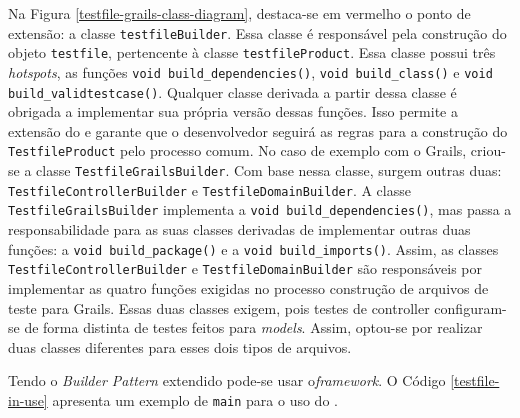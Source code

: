 Na Figura \ref{testfile-grails-class-diagram}, destaca-se em vermelho
o ponto de extensão: a classe \lstinline|testfileBuilder|. Essa classe é responsável
pela construção do objeto \lstinline|testfile|, pertencente à classe
\lstinline|testfileProduct|. Essa classe possui três \textit{hotspots}, as funções
\lstinline|void build_dependencies()|, \lstinline|void build_class()| e
\lstinline|void build_validtestcase()|. Qualquer classe derivada a partir dessa classe é
obrigada a implementar sua própria versão dessas funções. Isso permite a extensão
do \framework e garante que o desenvolvedor seguirá as regras para a construção do
\lstinline|TestfileProduct| pelo processo comum. No caso de exemplo com o
\textsf{Grails}, criou-se a classe \lstinline|TestfileGrailsBuilder|. Com base
nessa classe, surgem outras duas: \lstinline|TestfileControllerBuilder| e
\lstinline|TestfileDomainBuilder|. A classe \lstinline|TestfileGrailsBuilder|
implementa a \lstinline|void build_dependencies()|, mas passa a responsabilidade
para as suas classes derivadas de implementar outras duas funções: a
\lstinline|void build_package()| e a \lstinline|void build_imports()|. Assim,
as classes \lstinline|TestfileControllerBuilder| e \lstinline|TestfileDomainBuilder|
são responsáveis por implementar as quatro funções exigidas no processo
construção de arquivos de teste para \textsf{Grails}. Essas duas classes exigem, pois testes de controller configuram-se de forma
distinta de testes feitos para \textit{models}. Assim, optou-se por realizar duas classes
diferentes para esses dois tipos de arquivos.

Tendo o \textit{Builder Pattern} extendido pode-se usar o\textit{framework}.
O Código \ref{testfile-in-use} apresenta um exemplo de \lstinline|main| para
o uso do \Scarefault.

